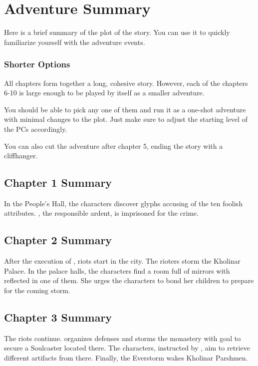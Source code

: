 \section{Adventure Summary}

Here is a brief summary of the plot of the story. You can use it to quickly familiarize yourself with the adventure events.

\subsubsection{Shorter Options}

All chapters form together a long, cohesive story. However, each of the chapters 6-10 is large enough to be played by itself as a smaller adventure. 

You should be able to pick any one of them and run it as a one-shot adventure with minimal changes to the plot. Just make sure to adjust the starting level of the PCs accordingly.

You can also cut the adventure after chapter 5, ending the story with a cliffhanger.

\subsection{Chapter 1 Summary}

In the People's Hall, the characters discover glyphs accusing \npcQueen{} of the ten foolish attributes. \npcRebelArdent{}, the responsible ardent, is imprisoned for the crime.

\subsection{Chapter 2 Summary}

After the execution of \npcRebelArdent{}, riots start in the city. The rioters storm the Kholinar Palace. In the palace halls, the characters find a room full of mirrors with \npcSjaAnat{} reflected in one of them. She urges the characters to bond her children to prepare for the coming storm.

\subsection{Chapter 3 Summary}

The riots continue. \npcHighmarshal{} organizes defenses and storms the monastery with goal to secure a Soulcaster located there. The characters, instructed by \npcSjaAnat{}, aim to retrieve different artifacts from there. Finally, the Everstorm wakes Kholinar Parshmen.

